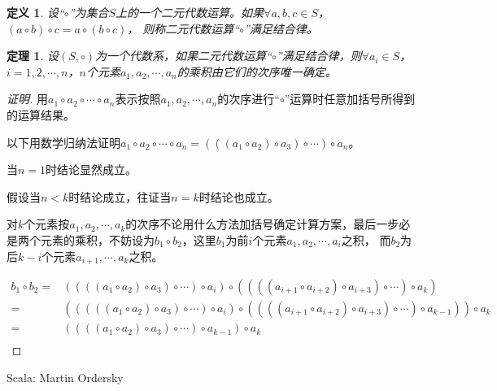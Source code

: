 \documentclass{article}
\newtheorem{Def}{定义}
\newtheorem{Thm}{定理}
\begin{document}
\begin{CJK*}{UTF8}{gbsn}
  \begin{Def}
    设“$\circ$”为集合$S$上的一个二元代数运算。如果$\forall a, b, c \in S$，$(a \circ b) \circ c = a \circ (b \circ c)$， 则称二元代数运算“$\circ$”满足结合律。
  \end{Def}
\begin{Thm}
  设$(S,\circ)$为一个代数系，如果二元代数运算“$\circ$”满足结合律，则$\forall a_i\in S$，$i=1,2,\cdots,n$，$n$个元素$a_1,a_2,\cdots,a_n$的乘积由它们的次序唯一确定。
\end{Thm}
\begin{proof}[证明]
  用$a_1\circ a_2\circ \cdots \circ a_n$表示按照$a_1,a_2, \cdots, a_n$的次序进行“$\circ$”运算时任意加括号所得到的运算结果。

  以下用数学归纳法证明$a_1\circ a_2\circ \cdots \circ a_n=(((a_1\circ a_2)\circ a_3)\circ \cdots )\circ a_n$。

  当$n=1$时结论显然成立。

  假设当$n<k$时结论成立，往证当$n=k$时结论也成立。

  对$k$个元素按$a_1,a_2,\cdots,a_k$的次序不论用什么方法加括号确定计算方案，最后一步必是两个元素的乘积，不妨设为$b_1\circ b_2$，这里$b_1$为前$i$个元素$a_1,a_2,\cdots,a_i$之积，
  而$b_2$为后$k-i$个元素$a_{i+1},\cdots,a_k$之积。

  \begin{align*}
    b_1\circ b_2 = &((((a_1\circ a_2)\circ a_3)\circ \cdots )\circ a_i)\circ ((((a_{i+1}\circ a_{i+2})\circ a_{i+3})\circ \cdots )\circ a_k)\\
                = &(((((a_1\circ a_2)\circ a_3)\circ \cdots )\circ a_i)\circ ((((a_{i+1}\circ a_{i+2})\circ a_{i+3})\circ \cdots )\circ a_{k-1}))\circ a_k\\
                =&((((a_1\circ a_2)\circ a_3)\circ \cdots )\circ a_{k-1})\circ a_k\\
  \end{align*}
\end{proof}

Scala: Martin Ordersky


\end{CJK*}
\end{document}

